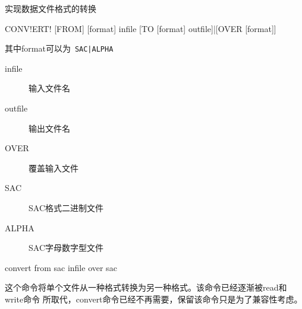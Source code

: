 \label{cmd:convert}

实现数据文件格式的转换

\begin{SACSTX}
CONV!ERT! [FROM] [format] infile [TO [format] outfile]|[OVER [format]]
\end{SACSTX}
其中format可以为~\verb+SAC|ALPHA+

\begin{description}
\item [infile] 输入文件名
\item [outfile] 输出文件名
\item [OVER] 覆盖输入文件
\item [SAC] SAC格式二进制文件
\item [ALPHA] SAC字母数字型文件
\end{description}

\begin{SACDFT}
convert from sac infile over sac
\end{SACDFT}

这个命令将单个文件从一种格式转换为另一种格式。该命令已经逐渐被read和write命令
所取代，convert命令已经不再需要，保留该命令只是为了兼容性考虑。
